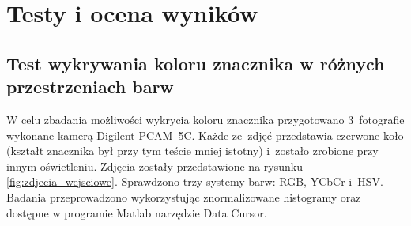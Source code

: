 \chapter{Testy i ocena wyników}
\label{cha:testy_i_ocena_wynikow}
\section{Test wykrywania koloru znacznika w różnych przestrzeniach barw} 
\label{sec:Test wykrywania koloru znacznika w różnych przestrzeniach barw}
W celu zbadania możliwości wykrycia koloru znacznika przygotowano 3~fotografie wykonane kamerą Digilent PCAM~5C. Każde ze~zdjęć przedstawia czerwone koło (kształt znacznika był przy tym teście mniej istotny) i~zostało zrobione przy innym oświetleniu. Zdjęcia zostały przedstawione na rysunku \ref{fig:zdjecia_wejsciowe}. Sprawdzono trzy systemy barw: RGB, YCbCr i~HSV. Badania przeprowadzono wykorzystując znormalizowane histogramy oraz dostępne w programie Matlab narzędzie Data Cursor.
